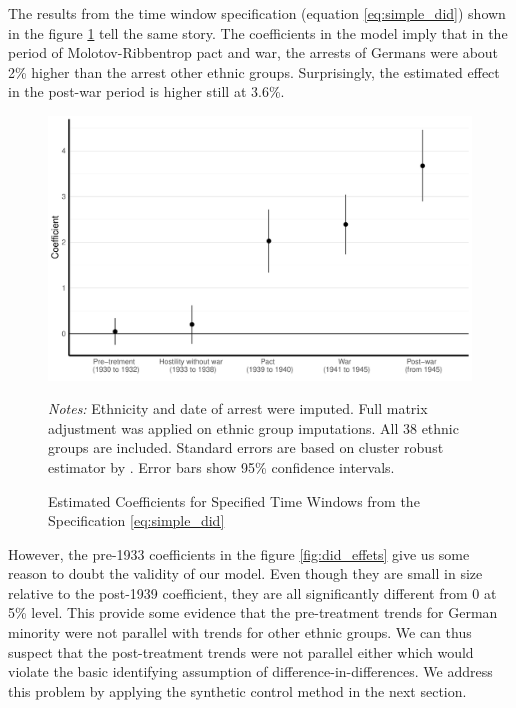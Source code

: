  
 The results from the time window specification (equation \ref{eq:simple_did}) shown in the figure \ref{fig:did_effets_time_window} tell the same story.  The coefficients in the model imply that in the period of Molotov-Ribbentrop pact and war, the arrests of Germans were about 2\% higher than the arrest other ethnic groups. Surprisingly, the estimated effect in the post-war period is higher still at  3.6\%.
 
 \begin{figure}[h]
\centering
\caption{Estimated Coefficients for Specified Time Windows from the Specification \ref{eq:simple_did} }
\includegraphics[width=\textwidth]{plots/effects/ethnicity_imputation/annual/time_window_pre_treatment_date_imp.pdf}
\begin{minipage}{0.92\textwidth}
\footnotesize
\emph{Notes:} Ethnicity and date of arrest were imputed.  Full matrix adjustment was applied on ethnic group imputations. All 38 ethnic groups are included. Standard errors are based on cluster robust estimator by \citet{pustejovsky_small-sample_2018}. Error bars show 95\% confidence intervals. 
\end{minipage}
\label{fig:did_effets_time_window}
\end{figure}
 
However, the pre-1933 coefficients in the figure \ref{fig:did_effets} give us some reason to doubt the
validity of our model. Even though they are small in size relative to the post-1939 coefficient, they are all  significantly different from 0 at 5\% level.
This provide some evidence that the pre-treatment trends for German minority were not parallel with trends for other ethnic groups. We can thus suspect that the post-treatment trends were not parallel either which
would violate the basic identifying assumption of
difference-in-differences.
We address this problem by applying the synthetic control method in the next section. 
 

